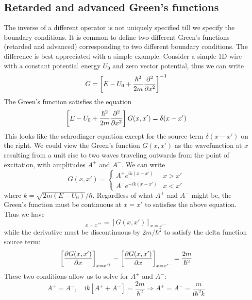 \documentclass[11pt,a4paper]{book}
\theoremstyle{plain}
\theoremstyle{definition}
\theoremstyle{remark}
\newcommand{\ii}{\mathrm{i}}                      %
\begin{document}
\subsection{Retarded and advanced Green's functions}
The inverse of a different operator is not uniquely specified till we specify the boundary conditions. It is common to define two different Green's functions (retarded and advanced) corresponding to two different boundary conditions. The difference is best appreciated with a simple example. Consider a simple 1D wire with a constant potential energy $U_0$ and zero vector potential, thus we can write
\begin{equation}
    G = \left[ E - U_0 + \frac{\hbar^2}{2m}\pdv{^2}{x^2} \right]^{-1}
\end{equation}
The Green's function satisfies the equation
\begin{equation}
    \left[ E - U_0 + \frac{\hbar^2}{2m}\pdv{^2}{x^2} \right] G(x,x') = \delta(x-x')
\end{equation}
This looks like the schrodinger equation except for the source term $\delta(x-x')$ on the right. We could view the Green's function $G(x,x')$ as the wavefunction at $x$ resulting from a unit rise to two waves traveling outwards from the point of excitation, with amplitudes $A^+$ and $A^-$. We can write
\begin{equation}
    G(x,x') =  \begin{cases}
        A^+ e^{i k (x - x')} & x > x' \\
        A^- e^{-i k (x - x')} & x < x'
    \end{cases}
\end{equation}
where $k = \sqrt{2 m (E - U_0)}/\hbar$. Regardless of what $A^+$ and $A^-$ might be, the Green's function must be continuous at $x = x'$ to satisfies the above equation. Thus we have
\begin{equation}
    [G(x,x')]_{x=x'^+} = [G(x,x')]_{x=x'^-}
\end{equation}
while the derivative must be discontinuous by $2 m/ \hbar^2$ to satisfy the delta function source term:
\begin{equation}
    \left[ \pdv{G(x,x')}{x} \right]_{x=x'^+} - \left[ \pdv{G(x,x')}{x} \right]_{x=x'^-} = \frac{2 m}{\hbar^2}
\end{equation}
These two conditions allow us to solve for $A^+$ and $A^-$:
\begin{equation}
    A^+ = A^-,\quad \ii k\left[A^+ + A^- \right] = \frac{2 m}{\hbar^2} \Rightarrow A^+ = A^- = \frac{m}{\ii \hbar^2 k}
\end{equation}
\end{document}

